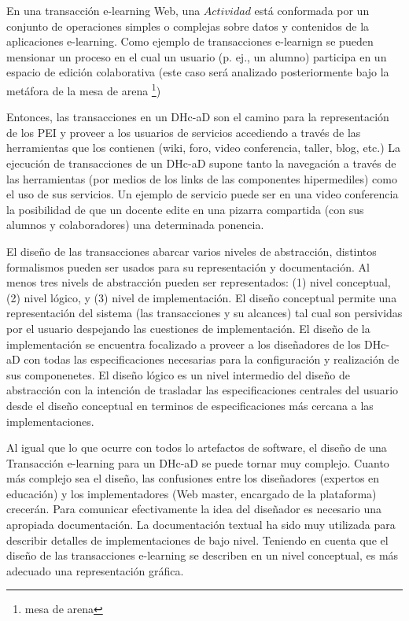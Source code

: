 \documentclass{llncs}
\begin{document}
En una transacción e-learning Web, una  $Actividad$ está  conformada por un conjunto de operaciones simples o complejas sobre datos y contenidos de la aplicaciones e-learning. Como ejemplo de transacciones e-learnign se pueden mensionar un proceso en el cual un usuario (p. ej., un alumno) participa en un espacio de edición colaborativa (este caso será analizado posteriormente bajo la metáfora de la mesa de arena \footnote{mesa de arena}) 

Entonces, las transacciones en un DHc-aD son el camino para la representación de los PEI y proveer a los usuarios de servicios accediendo a través de las herramientas que los contienen (wiki, foro, video conferencia, taller, blog, etc.) La ejecución de transacciones de un DHc-aD supone tanto la navegación a través de las herramientas (por medios de los links de las componentes hipermediles) como  el uso de sus servicios. Un ejemplo de servicio puede ser en una video conferencia la posibilidad de que un docente edite en una pizarra compartida (con sus alumnos y colaboradores) una determinada ponencia. 

El diseño de las transacciones  abarcar varios niveles de abstracción, distintos formalismos pueden ser usados para su representación y documentación. Al menos tres nivels de abstracción pueden ser representados: (1) nivel conceptual, (2) nivel lógico, y (3) nivel de implementación.  El diseño conceptual permite una representación del sistema (las transacciones y su alcances) tal cual son persividas por el usuario despejando las cuestiones de implementación. El diseño de la implementación se encuentra focalizado a proveer a los diseñadores de los DHc-aD con todas las especificaciones necesarias para la configuración y realización de sus componenetes. El diseño lógico es un nivel intermedio del diseño de abstracción con la intención de trasladar las especificaciones centrales del usuario desde el diseño conceptual en terminos de  especificaciones más cercana a las implementaciones.

Al igual que lo que ocurre con todos lo artefactos de software, el diseño de una Transacción e-learning para un DHc-aD  se puede tornar muy complejo. Cuanto más complejo sea el diseño, las confusiones entre los diseñadores (expertos en educación)  y los implementadores (Web master, encargado de la plataforma) crecerán. Para comunicar efectivamente la idea del diseñador es necesario una apropiada documentación. La documentación textual ha sido muy utilizada para describir detalles de implementaciones de bajo nivel. Teniendo en cuenta que el diseño de las transacciones e-learning se describen en un  nivel conceptual, es más adecuado una representación gráfica. 
\end{document}
